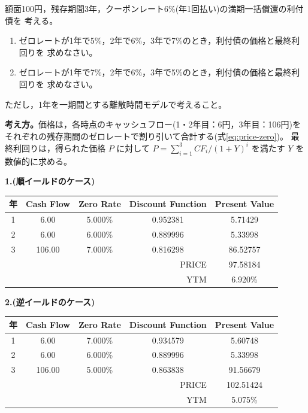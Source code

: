 \begin{exercise}[問題3-3：ゼロレートと債券価格]
額面100円，残存期間3年，クーポンレート6\%(年1回払い)の満期一括償還の利付債を
考える。
\begin{enumerate}
\item ゼロレートが1年で5\%，2年で6\%，3年で7\%のとき，利付債の価格と最終利回りを
求めなさい。
\item ゼロレートが1年で7\%，2年で6\%，3年で5\%のとき，利付債の価格と最終利回りを
求めなさい。
\end{enumerate}
ただし，1年を一期間とする離散時間モデルで考えること。
\end{exercise}

\begin{answerbox}
\textbf{考え方。}価格は，各時点のキャッシュフロー(1・2年目：6円，3年目：106円)を
それぞれの残存期間のゼロレートで割り引いて合計する(式\eqref{eq:price-zero})。
最終利回りは，得られた価格 $P$ に対して
$P = \sum_{i=1}^{3} CF_i/(1+Y)^i$ を満たす $Y$ を数値的に求める。

\medskip
\textbf{1.(順イールドのケース)}
\vspace{0.9em}
\begin{center}
\small
\begin{tabular}{ccccc}
\toprule
年 & Cash Flow & Zero Rate & Discount Function & Present Value\\
\midrule
1 & 6.00 & 5.000\% & 0.952381 & 5.71429\\
2 & 6.00 & 6.000\% & 0.889996 & 5.33998\\
3 & 106.00 & 7.000\% & 0.816298 & 86.52757\\
\midrule
\multicolumn{4}{r}{PRICE} & 97.58184\\
\multicolumn{4}{r}{YTM} & 6.920\%\\
\bottomrule
\end{tabular}
\end{center}
\vspace{0.9em}

\textbf{2.(逆イールドのケース)}
\vspace{0.9em}
\begin{center}
\small
\begin{tabular}{ccccc}
\toprule
年 & Cash Flow & Zero Rate & Discount Function & Present Value\\
\midrule
1 & 6.00 & 7.000\% & 0.934579 & 5.60748\\
2 & 6.00 & 6.000\% & 0.889996 & 5.33998\\
3 & 106.00 & 5.000\% & 0.863838 & 91.56679\\
\midrule
\multicolumn{4}{r}{PRICE} & 102.51424\\
\multicolumn{4}{r}{YTM} & 5.075\%\\
\bottomrule
\end{tabular}
\end{center}
\vspace{0.9em}


\end{answerbox}
